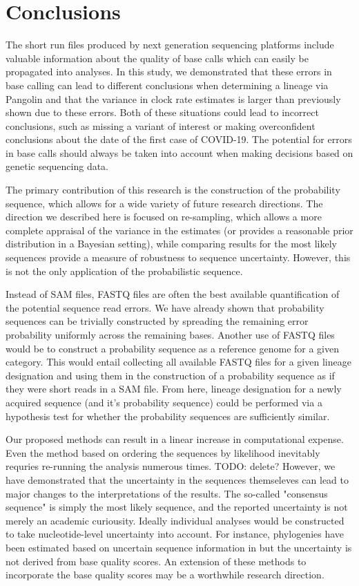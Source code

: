\documentclass[10pt]{article}
\begin{document}
\section{Conclusions}

The short run files produced by next generation sequencing platforms include valuable information about the quality of base calls which can easily be propagated into analyses.
In this study, we demonstrated that these errors in base calling can lead to different conclusions when determining a lineage via Pangolin and that the variance in clock rate estimates is larger than previously shown due to these errors.
Both of these situations could lead to incorrect conclusions, such as missing a variant of interest or making overconfident conclusions about the date of the first case of COVID-19.
The potential for errors in base calls should always be taken into account when making decisions based on genetic sequencing data.


The primary contribution of this research is the construction of the probability sequence, which allows for a wide variety of future research directions.
The direction we described here is focused on re-sampling, which allows a more complete appraisal of the variance in the estimates (or provides a reasonable prior distribution in a Bayesian setting), while comparing results for the most likely sequences provide a measure of robustness to sequence uncertainty.
However, this is not the only application of the probabilistic sequence.

Instead of SAM files, FASTQ files are often the best available quantification of the potential sequence read errors. 
We have already shown that probability sequences can be trivially constructed by spreading the remaining error probability uniformly across the remaining bases.
Another use of FASTQ files would be to construct a probability sequence as a reference genome for a given category.
This would entail collecting all available FASTQ files for a given lineage designation and using them in the construction of a probability sequence as if they were short reads in a SAM file.
From here, lineage designation for a newly acquired sequence (and it's probability sequence) could be performed via a hypothesis test for whether the probability sequences are sufficiently similar.

Our proposed methods can result in a linear increase in computational expense.
Even the method based on ordering the sequences by likelihood inevitably requries re-running the analysis numerous times. TODO: delete?
However, we have demonstrated that the uncertainty in the sequences themseleves can lead to major changes to the interpretations of the results.
The so-called "consensus sequence" is simply the most likely sequence, and the reported uncertainty is not merely an academic curiousity.
Ideally individual analyses would be constructed to take nucleotide-level uncertainty into account.
For instance, phylogenies have been estimated based on uncertain sequence information in \citet{rossOncoNEMInferringTumor2016, jahnTreeInferenceSinglecell2016, zafarSiFitInferringTumor2017} but the uncertainty is not derived from base quality scores.
An extension of these methods to incorporate the base quality scores may be a worthwhile research direction.
\end{document}
